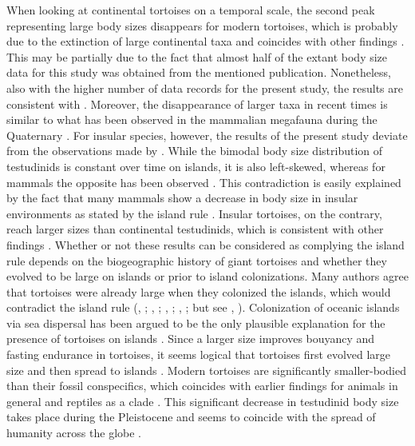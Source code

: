 When looking at continental tortoises on a temporal scale, the second peak representing large body sizes disappears for modern tortoises, which is probably due to the extinction of large continental taxa and coincides with other findings \citep{Itescu2014}. This may be partially due to the fact that almost half of the extant body size data for this study was obtained from the mentioned publication. Nonetheless, also with the higher number of data records for the present study, the results are consistent with \cite{Itescu2014}.
Moreover, the disappearance of larger taxa in recent times is similar to what has been observed in the mammalian megafauna during the Quaternary \citep{Lyons2008}.
For insular species, however, the results of the present study deviate from the observations made by \cite{Lyons2008}. While the bimodal body size distribution of testudinids is constant over time on islands, it is also left-skewed, whereas for mammals the opposite has been observed \citep{Lyons2008}. This contradiction is easily explained by the fact that many mammals show a decrease in body size in insular environments as stated by the island rule \citep{Foster1964}. Insular tortoises, on the contrary, reach larger sizes than continental testudinids, which is consistent with other findings \cite{Itescu2014,Jaffe2011a,Angielczyk2015}.
Whether or not these results can be considered as complying the island rule depends on the biogeographic history of giant tortoises and whether they evolved to be large on islands or prior to island colonizations. Many authors agree that tortoises were already large when they colonized the islands, which would contradict the island rule (\citeauthor{Itescu2014}, \citeyear{Itescu2014}; \citeauthor{Cheke2016}, \citeyear{Cheke2016}; \citeauthor{Gerlach2006}, \citeyear{Gerlach2006}; \citeauthor{Caccone1999}, \citeyear{Caccone1999}; but see \citeauthor{Jaffe2011a}, \citeyear{Jaffe2011a}).
Colonization of oceanic islands via sea dispersal has been argued to be the only plausible explanation for the presence of tortoises on islands \citep{Cheke2016}. Since a larger size improves bouyancy and fasting endurance in tortoises, it seems logical that tortoises first evolved large size and then spread to islands \citep{Patterson1973,Gerlach2006,Cheke2016,Pritchard1996,Jaffe2011a}.
Modern tortoises are significantly smaller-bodied than their fossil conspecifics, which coincides with earlier findings for animals in general \citep{Blackburn1994a} and reptiles as a clade \citep{Smith2016}. This significant decrease in testudinid body size takes place during the Pleistocene and seems to coincide with the spread of humanity across the globe \citep{Rhodin2015}.
